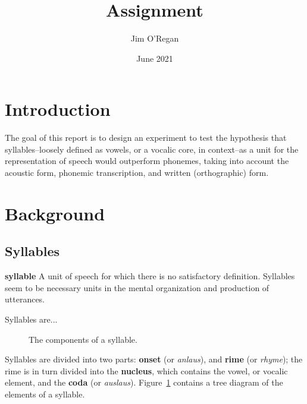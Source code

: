 \documentclass{article}[11pt]
\title{Assignment}
\author{Jim O'Regan}
\date{June 2021}
\begin{document}
\maketitle

\section{Introduction}

The goal of this report is to design an experiment to test the hypothesis that syllables--loosely defined as vowels, or a vocalic core, in context--as a unit for the representation of speech would outperform phonemes, taking into account the acoustic form, phonemic transcription, and written (orthographic) form.

\section{Background}

\subsection{Syllables}

\begin{displayquote}
\textbf{syllable} A unit of speech for which there is
no satisfactory definition. Syllables seem to
be necessary units in the mental organization and production of utterances.~\citep{ladefoged_course_2011}
\end{displayquote}

Syllables are...

\begin{figure}[!h]
\caption{The components of a syllable.}
\label{fig:syll}
\centering
{}
\end{figure}

Syllables are divided into two parts: \textbf{onset} (or \textit{anlaus}), and \textbf{rime} (or \textit{rhyme}); the rime is in turn divided into the \textbf{nucleus}, which contains the vowel, or vocalic element, and the \textbf{coda} (or \textit{auslaus}). Figure~\ref{fig:syll} contains a tree diagram of the elements of a syllable.
\end{document}
